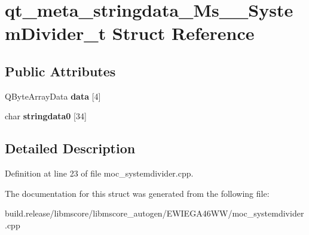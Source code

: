 \hypertarget{structqt__meta__stringdata___ms_____system_divider__t}{}\section{qt\+\_\+meta\+\_\+stringdata\+\_\+\+Ms\+\_\+\+\_\+\+System\+Divider\+\_\+t Struct Reference}
\label{structqt__meta__stringdata___ms_____system_divider__t}
\subsection*{Public Attributes}
\begin{DoxyCompactItemize}
\item 
\mbox{\label{structqt__meta__stringdata___ms_____system_divider__t_a270c6fa1acbf76dcc56cad325ac491ab}} 
Q\+Byte\+Array\+Data {\bfseries data} \mbox{[}4\mbox{]}
\item 
\mbox{\label{structqt__meta__stringdata___ms_____system_divider__t_a7152d84bcd12bf58b24f67a8212313b6}} 
char {\bfseries stringdata0} \mbox{[}34\mbox{]}
\end{DoxyCompactItemize}


\subsection{Detailed Description}


Definition at line 23 of file moc\+\_\+systemdivider.\+cpp.



The documentation for this struct was generated from the following file\+:\begin{DoxyCompactItemize}
\item 
build.\+release/libmscore/libmscore\+\_\+autogen/\+E\+W\+I\+E\+G\+A46\+W\+W/moc\+\_\+systemdivider.\+cpp\end{DoxyCompactItemize}
